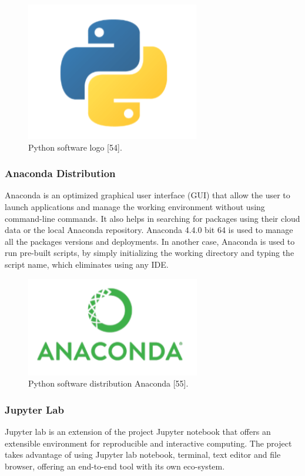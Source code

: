 \begin{figure}[ht]
\centering
\includegraphics{Figures/python}
\decoRule
\caption[Python software logo "54"]{Python software logo [54].}
\label{fig:la}
\end{figure}

\subsubsection{Anaconda Distribution}
\hspace{5mm} Anaconda is an optimized graphical user interface (GUI) that allow the user to launch applications and manage the working environment without using command-line commands. It also helps in searching for packages using their cloud data or the local Anaconda repository. Anaconda 4.4.0 bit 64 is used to manage all the packages versions and deployments. In another case, Anaconda is used to run pre-built scripts, by simply initializing the working directory and typing the script name, which eliminates using any IDE.
\begin{figure}[ht]
\centering
\includegraphics{Figures/anaconda}
\decoRule
\caption[Python software distribution Anaconda "55".]{Python software distribution Anaconda [55].}
\label{fig:la}
\end{figure}
\subsubsection{Jupyter Lab}
\hspace{5mm} Jupyter lab is an extension of the project Jupyter notebook that offers an extensible environment for reproducible and interactive computing. The project takes advantage of using Jupyter lab notebook, terminal, text editor and file browser, offering an end-to-end tool with its own eco-system.\\

